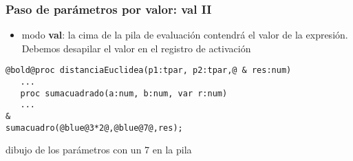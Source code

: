 \documentclass[hyperref={pdfpagelabels=false},tree-dvips,compress]{beamer}
\begin{document}
\begin{frame}[fragile]
\frametitle{Paso de parámetros por valor: val II}

\begin{itemize}
	\item modo \textbf{val}: la cima de la pila de
evaluación contendrá el valor de la expresión. Debemos desapilar el valor en el registro de activación
\end{itemize}

\begin{lstlisting}[style=codigo,basicstyle=\footnotesize\ttfamily]
@bold@proc distanciaEuclidea(p1:tpar, p2:tpar,@ & res:num)
   ...
   proc sumacuadrado(a:num, b:num, var r:num)
   ...
&
sumacuadro(@blue@3*2@,@blue@7@,res);
\end{lstlisting}

dibujo de los parámetros con un 7 en la pila

\end{frame}
\end{document}
